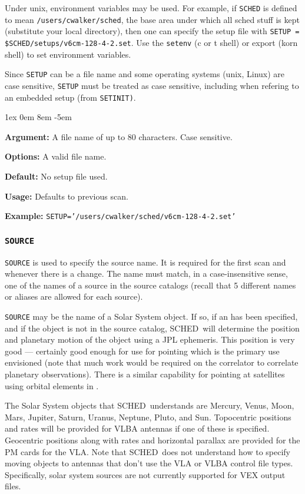 \documentclass{report}
\newcommand{\schedb}{{\sc SCHED~}}
\newcommand{\rcwbox}[5]{
  \begin{list}{}{\parsep 1ex  \itemsep 0em
                 \leftmargin 8em  \itemindent -5em }
    \item {\bf Argument:} #1
    \item {\bf Options:}  #2
    \item {\bf Default:}  #3
    \item {\bf Usage:}    #4
    \item {\bf Example:}  #5
  \end{list}
}
\begin{document}
Under unix, environment variables may be used.  For example, if
{\tt SCHED} is defined to mean {\tt /users/cwalker/sched}, the
base area under which all sched stuff is kept (substitute your
local directory), then one can specify the setup file with
{\tt SETUP = \$SCHED/setups/v6cm-128-4-2.set}.  Use the {\tt setenv}
(c or t shell) or export (korn shell) to set environment variables.

Since {\tt SETUP} can be a file name and some operating systems (unix,
Linux) are case sensitive, {\tt SETUP} must be treated as case sensitive,
including when refering to an embedded setup (from {\tt SETINIT)}.

\rcwbox
{A file name of up to 80 characters.  Case sensitive.}
{A valid file name.}
{No setup file used.}
{Defaults to previous scan.}
{{\tt SETUP='/users/cwalker/sched/v6cm-128-4-2.set'}}


\subsubsection{\label{MP:SOURCE}{\tt SOURCE}}

{\tt SOURCE} is used to specify the source name.  It is required for
the first scan and whenever there is a change. The name must match, in
a case-insensitive sense, one of the names of a source in the source
catalogs (recall that 5 different names or aliases are allowed for
each source).

{\tt SOURCE} may be the name of a Solar System object.  If so, if
an  has been specified, and if the
object is not in the source catalog, \schedb will determine the position
and planetary motion of the object using a JPL ephemeris.  This position
is very good --- certainly good enough for use for pointing which
is the primary use envisioned (note that much work would be required
on the correlator to correlate planetary observations).  There is
a similar capability for pointing at satellites using orbital
elements in .

The Solar System objects that \schedb understands are Mercury, Venus,
Moon, Mars, Jupiter, Saturn, Uranus, Neptune, Pluto, and Sun.
Topocentric positions and rates will be provided for VLBA antennas if
one of these is specified.  Geocentric positions along with rates and
horizontal parallax are provided for the PM cards for the VLA.  Note
that \schedb does not understand how to specify moving objects to
antennas that don't use the VLA or VLBA control file types.
Specifically, solar system sources are not currently supported
for VEX output files.
\end{document}
